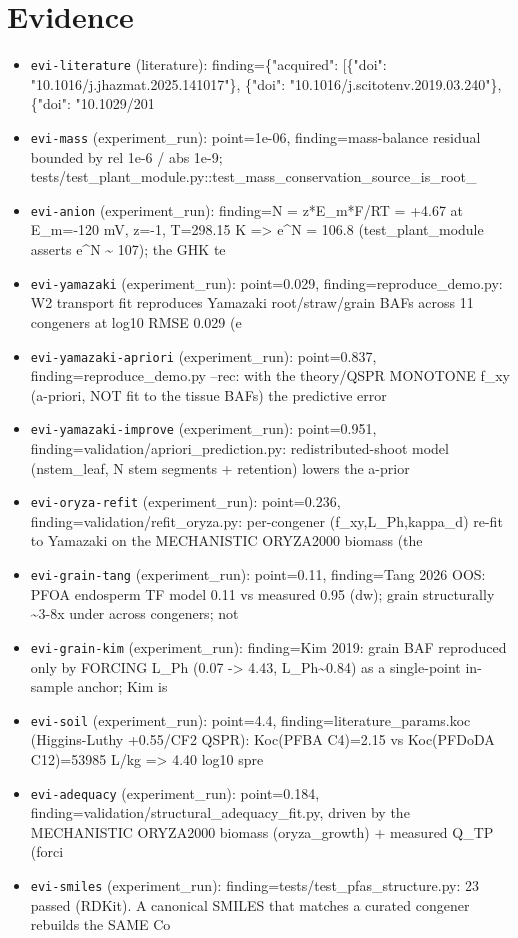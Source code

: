 \documentclass{article}
\begin{document}
\section{Evidence}
\begin{itemize}
  \item \texttt{evi-literature} (literature): finding=\{"acquired": [\{"doi": "10.1016/j.jhazmat.2025.141017"\}, \{"doi": "10.1016/j.scitotenv.2019.03.240"\}, \{"doi": "10.1029/201
  \item \texttt{evi-mass} (experiment\_run): point=1e-06, finding=mass-balance residual bounded by rel 1e-6 / abs 1e-9; tests/test\_plant\_module.py::test\_mass\_conservation\_source\_is\_root\_
  \item \texttt{evi-anion} (experiment\_run): finding=N = z*E\_m*F/RT = +4.67 at E\_m=-120 mV, z=-1, T=298.15 K => e\textasciicircum{}N = 106.8 (test\_plant\_module asserts e\textasciicircum{}N \textasciitilde{} 107); the GHK te
  \item \texttt{evi-yamazaki} (experiment\_run): point=0.029, finding=reproduce\_demo.py: W2 transport fit reproduces Yamazaki root/straw/grain BAFs across 11 congeners at log10 RMSE 0.029 (e
  \item \texttt{evi-yamazaki-apriori} (experiment\_run): point=0.837, finding=reproduce\_demo.py --rec: with the theory/QSPR MONOTONE f\_xy (a-priori, NOT fit to the tissue BAFs) the predictive error 
  \item \texttt{evi-yamazaki-improve} (experiment\_run): point=0.951, finding=validation/apriori\_prediction.py: redistributed-shoot model (nstem\_leaf, N stem segments + retention) lowers the a-prior
  \item \texttt{evi-oryza-refit} (experiment\_run): point=0.236, finding=validation/refit\_oryza.py: per-congener (f\_xy,L\_Ph,kappa\_d) re-fit to Yamazaki on the MECHANISTIC ORYZA2000 biomass (the
  \item \texttt{evi-grain-tang} (experiment\_run): point=0.11, finding=Tang 2026 OOS: PFOA endosperm TF model 0.11 vs measured 0.95 (dw); grain structurally \textasciitilde{}3-8x under across congeners; not 
  \item \texttt{evi-grain-kim} (experiment\_run): finding=Kim 2019: grain BAF reproduced only by FORCING L\_Ph (0.07 -> 4.43, L\_Ph\textasciitilde{}0.84) as a single-point in-sample anchor; Kim is
  \item \texttt{evi-soil} (experiment\_run): point=4.4, finding=literature\_params.koc (Higgins-Luthy +0.55/CF2 QSPR): Koc(PFBA C4)=2.15 vs Koc(PFDoDA C12)=53985 L/kg => 4.40 log10 spre
  \item \texttt{evi-adequacy} (experiment\_run): point=0.184, finding=validation/structural\_adequacy\_fit.py, driven by the MECHANISTIC ORYZA2000 biomass (oryza\_growth) + measured Q\_TP (forci
  \item \texttt{evi-smiles} (experiment\_run): finding=tests/test\_pfas\_structure.py: 23 passed (RDKit). A canonical SMILES that matches a curated congener rebuilds the SAME Co
\end{itemize}
\end{document}
